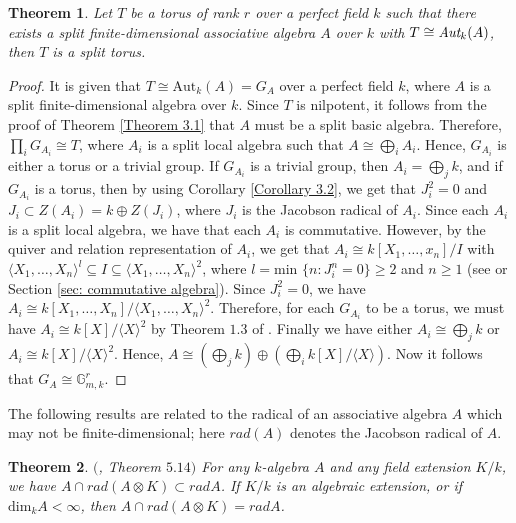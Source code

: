 \documentclass[12pt]{amsart}
\newtheorem{theorem}{Theorem}[section]
\theoremstyle{definition}
\numberwithin{equation}{section}
\begin{document}
\vskip2mm
\begin{theorem}\label{Theorem 3.4}
 Let $T$ be a torus of rank $r$ over a perfect field $k$ such that there exists a split finite-dimensional associative algebra $A$ over $k$ with $T\cong \emph{\text{Aut}}_k(A)$, then $T$ is a split torus.
\end{theorem}
\begin{proof}
It is given that $T\cong \text{Aut}_k(A)=G_A$ over a perfect field $k$, where $A$ is a split finite-dimensional algebra over $k$. Since $T$ is nilpotent, it follows from the proof of Theorem \ref{Theorem 3.1} that $A$ must be a split basic algebra. Therefore, $\prod_i G_{A_i}\cong T$, where $A_i$ is a split local algebra such that $A\cong \bigoplus_i A_i$. Hence, $G_{A_i}$ is either a torus or a trivial group. If $G_{A_i}$ is a trivial group, then $A_i=\bigoplus_j k$, and if $G_{A_i}$ is a torus, then by using Corollary \ref{Corollary 3.2}, we get that $J_i^2=0$ and $J_i\subset Z(A_i)=k\oplus Z(J_i)$, where $J_i$ is the Jacobson radical of $A_i$. Since each $A_i$ is a split local algebra, we have that each $A_i$ is commutative. However, by the quiver and relation representation of $A_i$, we get that $A_i\cong k[X_1,\dots,x_n]/I$ with $\langle X_1,\dots,X_n\rangle^l\subseteq I \subseteq\langle X_1,\dots,X_n\rangle^2$, where $l=\text{min }\{n:J_i^n=0\}\geq 2$ and $n\geq 1$ (see \cite{AS1} or Section \ref{sec: commutative algebra}). Since $J_{i}^2=0$, we have $A_i\cong k[X_1,\dots,X_n]/\langle X_1,\dots, X_n\rangle^2$. Therefore, for each $G_{A_i}$ to be a torus, we must have $A_i\cong k[X]/\langle X\rangle^2$ by Theorem $1.3$ of \cite{AS1}. Finally we have either $A_i\cong \bigoplus_j k$ or $A_i\cong k[X]/\langle X\rangle^2$. Hence, $A\cong (\bigoplus_j k)\oplus (\bigoplus_i k[X]/\langle X\rangle).$ Now it follows that $G_A\cong \mathbb{G}_{m,k}^r$.
\end{proof}

\vskip2mm
\noindent
The following results are related to the radical of an associative algebra $A$ which may not be finite-dimensional; here $rad(A)$ denotes the Jacobson radical of $A$.

\vskip2mm

\begin{theorem}\label{Theorem 3.5}
$($\cite{Lam}, \emph{Theorem} $5.14)$ For any $k$-algebra $A$ and any field extension $K/k$, we have $A\cap rad(A\otimes K)\subset rad A$. If $K/k$ is an algebraic extension, or if $\mathrm{dim}_{k}A < \infty$, then $A \cap rad(A\otimes K)=rad A$.
\end{theorem}
\end{document}
